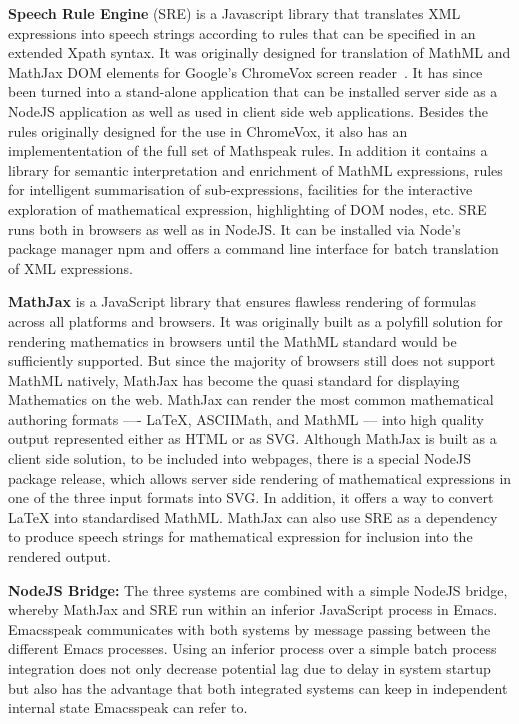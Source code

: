 \documentclass{sig-alternate}
\newcommand{\latex}{\LaTeX\xspace}
\newcommand{\sre}{SRE\xspace}
\def\latex{\LaTeX}
\begin{document}
\textbf{Speech Rule Engine} (\sre) is a Javascript library that translates XML
expressions into speech strings according to rules that can be specified in an
extended Xpath syntax. It was originally designed for translation of MathML and
MathJax DOM elements for Google's ChromeVox screen reader~\cite{Sorge14}. It has
since been turned into a stand-alone application that can be installed server
side as a NodeJS application as well as used in client side web applications.
Besides the rules originally designed for the use in ChromeVox, it also has an
implemententation of the full set of Mathspeak rules. In addition it contains a
library for semantic interpretation and enrichment of MathML expressions, rules
for intelligent summarisation of sub-expressions, facilities for the interactive
exploration of mathematical expression, highlighting of DOM nodes, etc.  SRE
runs both in browsers as well as in NodeJS. It can be installed via Node's
package manager npm and offers a command line interface for batch translation of
XML expressions.


\textbf{MathJax} is a JavaScript library that ensures flawless rendering of
formulas across all platforms and browsers. It was originally built as a
polyfill solution for rendering mathematics in browsers until the MathML
standard would be sufficiently supported. But since the majority of browsers
still does not support MathML natively, MathJax has become the quasi standard
for displaying Mathematics on the web.  MathJax can render the most common
mathematical authoring formats ---- {\latex}, ASCIIMath, and MathML --- into
high quality output represented either as HTML or as SVG.  Although MathJax is
built as a client side solution, to be included into webpages, there is a
special NodeJS package release, which allows server side rendering of
mathematical expressions in one of the three input formats into SVG. In
addition, it offers a way to convert {\latex} into standardised MathML. MathJax
can also use \sre as a dependency to produce speech strings for mathematical
expression for inclusion into the rendered output.

\textbf{NodeJS Bridge:} The three systems are combined with a simple NodeJS
bridge, whereby MathJax and \sre run within an inferior JavaScript process in
Emacs. Emacsspeak communicates with both systems by message passing
between the different Emacs processes.  Using an inferior process over a simple
batch process integration does not only decrease potential lag due to delay in
system startup but also has the advantage that both integrated systems can keep
in independent internal state Emacsspeak can refer to.
\end{document}
